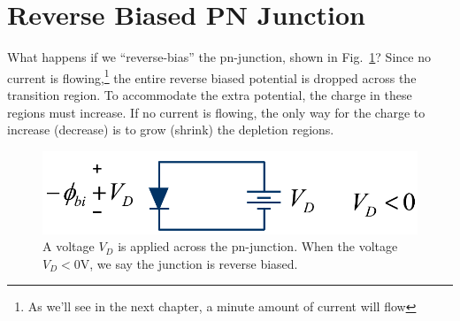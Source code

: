 \section{Reverse Biased PN Junction}
What happens if we “reverse-bias” the pn-junction, shown in Fig.~\ref{fig:slide28}?  Since no current is flowing,\footnote{As we'll see in the next chapter, a minute amount of current will flow} the entire reverse biased potential is dropped across the transition region.   To accommodate the extra potential, the charge in these regions must increase.   If no current is flowing, the only way for the charge to increase (decrease) is to grow (shrink) the depletion regions.
\begin{figure}[tb]
\centering
\includegraphics[width=.5\columnwidth]{slide28}
\caption{A voltage $V_D$ is applied across the pn-junction.  When the voltage $V_D < 0$V, we say the junction is reverse biased.}
\label{fig:slide28}
\end{figure}
